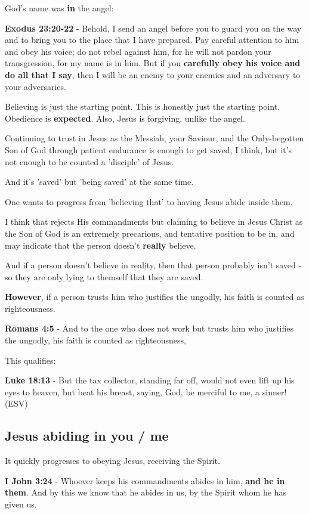 \documentclass[11pt]{article}
\begin{document}
God's name was \textbf{in} the angel:

\textbf{Exodus 23:20-22} - Behold, I send an angel before you to guard you on the way and to bring you to the place that I have prepared. Pay careful attention to him and obey his voice; do not rebel against him, for he will not pardon your transgression, for my name is in him. But if you \textbf{carefully obey his voice and do all that I say}, then I will be an enemy to your enemies and an adversary to your adversaries.

Believing is just the starting point. This is honestly just the starting point. Obedience is \textbf{expected}. Also, Jesus is forgiving, unlike the angel.

Continuing to trust in Jesus as the Messiah, your Saviour, and the Only-begotten Son of God through patient endurance is enough to get saved, I think, but it's not enough to be counted a 'disciple' of Jesus.

And it's 'saved' but 'being saved' at the same time.

One wants to progress from 'believing that' to having Jesus abide inside them.

I think that rejects His commandments but claiming to believe in Jesus Christ as the Son of God is an extremely precarious, and tentative position to be in,
and may indicate that the person doesn't \textbf{really} believe.

And if a person doesn't believe in reality, then that person probably isn't saved - so they are only lying to themself that they are saved.

\textbf{However}, if a person trusts him who justifies the ungodly, his faith is counted as righteousness.

\textbf{Romans 4:5} - And to the one who does not work but trusts him who justifies the ungodly, his faith is counted as righteousness,

This qualifies:

\textbf{Luke 18:13} - But the tax collector, standing far off, would not even lift up his eyes to heaven, but beat his breast, saying, God, be merciful to me, a sinner! (ESV)

\subsection{Jesus abiding in \textbf{you} / \textbf{me}}
\label{sec:org7023d86}
It quickly progresses to obeying Jesus, receiving the Spirit.

\textbf{I John 3:24} - Whoever keeps his commandments abides in him, \textbf{and he in them}. And by this we know that he abides in us, by the Spirit whom he has given us.
\end{document}
